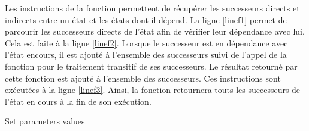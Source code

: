 
\begin{algorithm}[H]
 \SetAlgoLined\DontPrintSemicolon
\end{algorithm}

Les instructions  de la fonction  permettent de récupérer les successeurs directs et indirects entre un état et les états dont-il dépend. La ligne \ref{linef1} permet de parcourir les successeurs directs de l'état afin de vérifier leur dépendance avec lui. Cela est faite à la ligne \ref{linef2}.  Lorsque le successeur est en dépendance avec l'état encours, il est ajouté à l'ensemble des successeurs suivi de l'appel de la fonction  pour le traitement transitif de ses successeurs. Le résultat retourné par cette fonction  est ajouté  à l'ensemble des successeurs. Ces instructions sont exécutées à la ligne \ref{linef3}. Ainsi, la fonction retournera touts les successeurs de l'état en cours à la fin de son exécution.  
\\

\begin{algorithm}[H]\label{alg4}
\SetAlgoLined
{}
 \caption{Set parameters values}
\end{algorithm}

